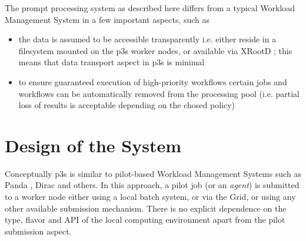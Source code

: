 \documentclass{PoS}
\begin{document}
\noindent The prompt processing system as described here differs from a typical Workload Management System in a few important
aspects, such as
\begin{itemize}
\item the data is assumed to be accessible transparently i.e. either reside in a filesystem mounted on the p3s worker nodes,
or available via XRootD \cite{xrootd}; this means that data transport aspect in p3s is minimal

\item to ensure guaranteed execution of high-priority workflows certain jobs and workflows can be automatically
removed from the processing pool (i.e. partial loss of results is acceptable depending on the chosed policy)

\end{itemize}

\section{Design of the System}
Conceptually p3s is similar to pilot-based Workload Management Systems such as Panda \cite{panda}, Dirac \cite{dirac} and others. In this approach,
a pilot job (or an \textit{agent})  is submitted to a worker node either using a local batch system, or via the Grid, or using
any other available submission mechanism. There is no explicit dependence on the type, flavor and API of the local computing
environment apart from the pilot submission aspect.
\end{document}
